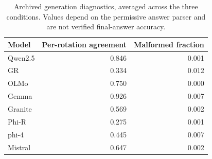 \begin{table}[ht]
\caption{Archived generation diagnostics, averaged across the three conditions. Values depend on the permissive answer parser and are not verified final-answer accuracy.}
\label{tab:generation}\centering\small
\begin{tabular}{lrr}\toprule
Model & Per-rotation agreement & Malformed fraction\\\midrule
Qwen2.5 & 0.846 & 0.001\\
GR & 0.334 & 0.012\\
OLMo & 0.750 & 0.000\\
Gemma & 0.926 & 0.007\\
Granite & 0.569 & 0.002\\
Phi-R & 0.275 & 0.001\\
phi-4 & 0.445 & 0.007\\
Mistral & 0.647 & 0.002\\
\bottomrule\end{tabular}\end{table}